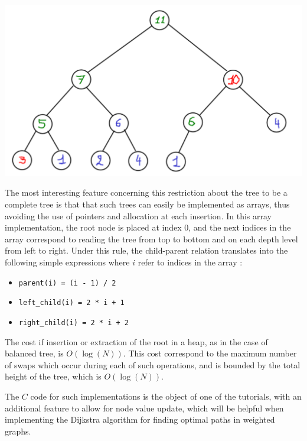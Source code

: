 \documentclass[12pt]{article}
\theoremstyle{plain}
\theoremstyle{remark}
\begin{document}
\begin{center}
	\includegraphics[width=14cm]{data/heap3.pdf}
\end{center}

The most interesting feature concerning this restriction about the tree to be a 
complete tree is that that such trees can easily be implemented as arrays, thus
avoiding the use of pointers and allocation at each insertion. In this array
implementation, the root node is placed at index 0, and the next indices in 
the array correspond to reading the tree from top to bottom and on each depth
level from left to right. Under this rule, the child-parent relation  
translates into the following simple expressions where $i$ refer to indices in
the array :
\begin{itemize}
	\item
		{\tt parent(i) = (i - 1) / 2}
	\item {\tt left\_child(i) = 2 * i + 1}
	\item {\tt right\_child(i) = 2 * i + 2}
\end{itemize}

The cost if insertion or extraction of the root in a heap, as in the case of
balanced tree, is $O(\log(N))$. This cost correspond to the maximum number of
swaps which occur during each of such operations, and is bounded by the total height of
the tree, which is $O(\log(N))$.

The $C$ code for such implementations is the object of one of the tutorials,
with an additional feature to allow for node value update, which will be helpful
when implementing the Dijkstra algorithm for finding optimal paths in weighted graphs.


\pagebreak
\end{document}

